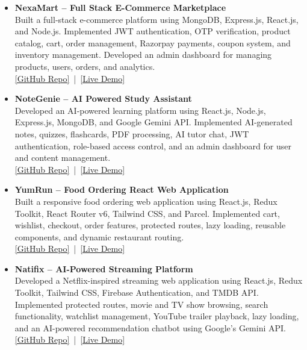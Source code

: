 \documentclass[a4paper,10pt]{article}
\newcommand{\resumeItem}[1]{
 \item \small{#1}
}
\begin{document}
\begin{itemize}

\resumeItem{
\textbf{NexaMart -- Full Stack E-Commerce Marketplace} \\
Built a full-stack e-commerce platform using MongoDB, Express.js, React.js, and Node.js. Implemented JWT authentication, OTP verification, product catalog, cart, order management, Razorpay payments, coupon system, and inventory management. Developed an admin dashboard for managing products, users, orders, and analytics. \\
{\scriptsize \href{https://github.com/zaid154/Nexa-Mart}{[GitHub Repo]} \,|\, \href{https://nexamart-28c93.web.app}{[Live Demo]}}
}

\resumeItem{
\textbf{NoteGenie -- AI Powered Study Assistant} \\
Developed an AI-powered learning platform using React.js, Node.js, Express.js, MongoDB, and Google Gemini API. Implemented AI-generated notes, quizzes, flashcards, PDF processing, AI tutor chat, JWT authentication, role-based access control, and an admin dashboard for user and content management. \\
{\scriptsize \href{https://github.com/zaid154/NoteGenie}{[GitHub Repo]} \,|\, \href{https://notegenie-d5199.web.app}{[Live Demo]}}
}

\resumeItem{
\textbf{YumRun -- Food Ordering React Web Application} \\
Built a responsive food ordering web application using React.js, Redux Toolkit, React Router v6, Tailwind CSS, and Parcel. Implemented cart, wishlist, checkout, order features, protected routes, lazy loading, reusable components, and dynamic restaurant routing. \\
{\scriptsize \href{https://github.com/zaid154/Food-App}{[GitHub Repo]} \,|\, \href{https://yumrun-2e144.web.app}{[Live Demo]}}
}

\resumeItem{
\textbf{Natifix -- AI-Powered Streaming Platform} \\
Developed a Netflix-inspired streaming web application using React.js, Redux Toolkit, Tailwind CSS, Firebase Authentication, and TMDB API. Implemented protected routes, movie and TV show browsing, search functionality, watchlist management, YouTube trailer playback, lazy loading, and an AI-powered recommendation chatbot using Google's Gemini API. \\
{\scriptsize \href{https://github.com/zaid154/Natifix}{[GitHub Repo]} \,|\, \href{https://natifix-6703d.web.app}{[Live Demo]}}
}

\end{itemize}
\end{document}
